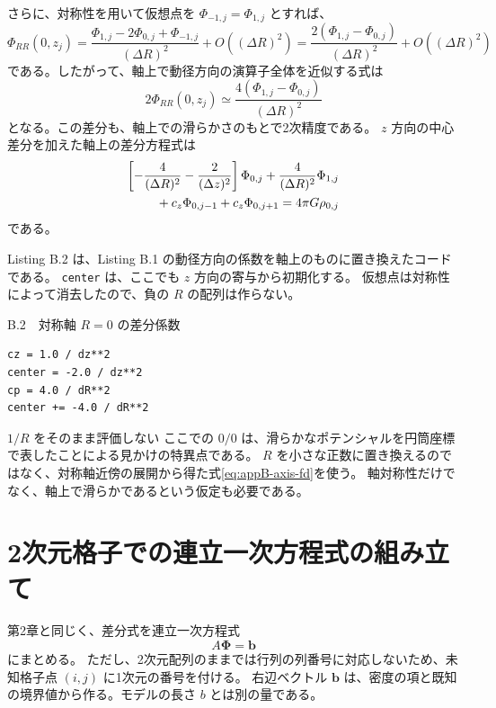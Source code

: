 さらに、対称性を用いて仮想点を $\Phi_{-1,j}=\Phi_{1,j}$ とすれば、
\begin{equation}
 \Phi_{RR}(0,z_j)=\frac{\Phi_{1,j}-2\Phi_{0,j}+\Phi_{-1,j}}{(\Delta R)^2}+O((\Delta R)^2)=\frac{2(\Phi_{1,j}-\Phi_{0,j})}{(\Delta R)^2}+O((\Delta R)^2)
\end{equation}
である。したがって、軸上で動径方向の演算子全体を近似する式は
\begin{equation}
 \boxed{2\Phi_{RR}(0,z_j)\simeq\frac{4(\Phi_{1,j}-\Phi_{0,j})}{(\Delta R)^2}}
\label{eq:appB-axis-fd}
\end{equation}
となる。この差分も、軸上での滑らかさのもとで2次精度である。
$z$ 方向の中心差分を加えた軸上の差分方程式は
\begin{align}
 \left[-\frac{4}{(\Delta R)^2}-\frac{2}{(\Delta z)^2}\right]\Phi_{0,j}+\frac{4}{(\Delta R)^2}\Phi_{1,j}\notag\\
 {}+c_z\Phi_{0,j-1}+c_z\Phi_{0,j+1}=4\pi G\rho_{0,j}
\label{eq:appB-axis-row}
\end{align}
である。

Listing B.2 は、Listing B.1 の動径方向の係数を軸上のものに置き換えたコードである。
\texttt{center} は、ここでも $z$ 方向の寄与から初期化する。
仮想点は対称性によって消去したので、負の $R$ の配列は作らない。

\begin{listingbox}{B.2　対称軸 $R=0$ の差分係数}
\begin{Verbatim}[fontsize=\small]
cz = 1.0 / dz**2
center = -2.0 / dz**2
cp = 4.0 / dR**2
center += -4.0 / dR**2
\end{Verbatim}
\end{listingbox}

\begin{cautionblock}{$1/R$ をそのまま評価しない}
ここでの $0/0$ は、滑らかなポテンシャルを円筒座標で表したことによる見かけの特異点である。
$R$ を小さな正数に置き換えるのではなく、対称軸近傍の展開から得た式\eqref{eq:appB-axis-fd}を使う。
軸対称性だけでなく、軸上で滑らかであるという仮定も必要である。
\end{cautionblock}

\section{2次元格子での連立一次方程式の組み立て}
\label{sec:appB-flatten}

第2章と同じく、差分式を連立一次方程式
\begin{equation}
 A\boldsymbol{\Phi}=\boldsymbol{b}
\label{eq:appB-linear-system}
\end{equation}
にまとめる。
ただし、2次元配列のままでは行列の列番号に対応しないため、未知格子点 $(i,j)$ に1次元の番号を付ける。
右辺ベクトル $\boldsymbol{b}$ は、密度の項と既知の境界値から作る。モデルの長さ $b$ とは別の量である。


